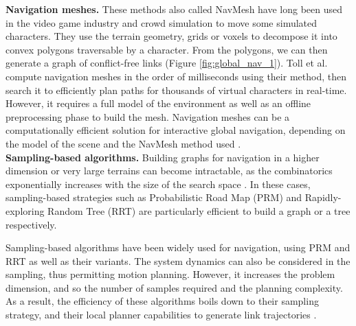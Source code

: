 \noindent\textbf{Navigation meshes.}
These methods also called NavMesh \cite{navMesh_book_snook_2000} have long been used in the video game industry \cite{Brewer2019TacticalPO} and crowd simulation \cite{van_toll_crowd_sim_2012} to move some simulated characters. 
They use the terrain geometry, grids or voxels to decompose it into convex polygons traversable by a character. From the polygons, we can then generate a graph of conflict-free links (Figure \ref{fig:global_nav_1}).
Toll et al. \cite{toll_2011_navMesh, toll_2018_navMesh_multiLayer} compute navigation meshes in the order of milliseconds using their method, then search it to efficiently plan paths for thousands of virtual characters in real-time.
However, it requires a full model of the environment as well as an offline preprocessing phase to build the mesh.
Navigation meshes can be a computationally efficient solution for interactive global navigation, depending on the model of the scene and the NavMesh method used \cite{pettre_comparative_navMesh_2016}.\\


\noindent\textbf{Sampling-based algorithms.\label{subsubpar:sampling_based_algo}}
Building graphs for navigation in a higher dimension or very large terrains can become intractable, as the combinatorics exponentially increases with the size of the search space \cite{hauser_robotics_systems_draft}.
In these cases, sampling-based strategies such as Probabilistic Road Map (PRM) \cite{prm_1996} and Rapidly-exploring Random Tree (RRT) \cite{RRT_1998} are particularly efficient to build a graph or a tree respectively.

Sampling-based algorithms have been widely used for navigation, using PRM \cite{move3d_lamiraux_2001, sabo_aerial_fuzzy_2012, mohanta_prm_navigation_2019} and RRT \cite{Zammit2018ComparisonBA} as well as their variants.
The system dynamics can also be considered in the sampling, thus permitting motion planning.
However, it increases the problem dimension, and so the number of samples required and the planning complexity.
As a result, the efficiency of these algorithms boils down to their sampling strategy, and their local planner capabilities to generate link trajectories \cite{kinodynamic_sm_2017, prm_rl_2019}.\\

